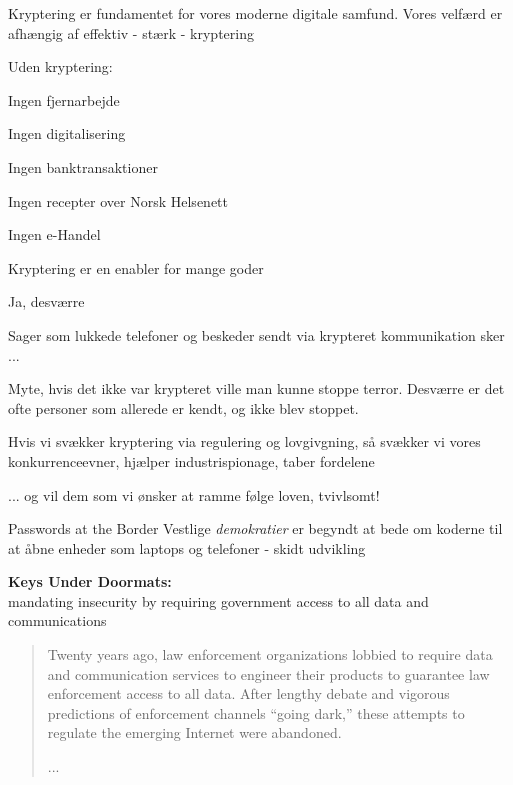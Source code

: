 \documentclass[20pt,landscape,a4paper,footrule]{foils}
\begin{document}

Kryptering er fundamentet for vores moderne digitale samfund. Vores velfærd er afhængig af effektiv - stærk - kryptering

Uden kryptering:
\begin{list2}
\item Ingen fjernarbejde
\item Ingen digitalisering
\item Ingen banktransaktioner
\item Ingen recepter over Norsk Helsenett
\item Ingen e-Handel
\end{list2}

\centerline{Kryptering er en enabler for mange goder}


Ja, desværre

Sager som lukkede telefoner og beskeder sendt via krypteret kommunikation sker ...

Myte, hvis det ikke var krypteret ville man kunne stoppe terror. Desværre er det ofte personer som allerede er kendt, og ikke blev stoppet.

Hvis vi svækker kryptering via regulering og lovgivgning, så svækker vi vores konkurrenceevner, hjælper industrispionage, taber fordelene

... og vil dem som vi ønsker at ramme følge loven, tvivlsomt!


Passwords at the Border
Vestlige \emph{demokratier} er begyndt at bede om koderne til at åbne enheder som laptops og telefoner - skidt udvikling

{\bf Keys Under Doormats:}\\
mandating insecurity by requiring government access to all
data and communications

\begin{quote}
Twenty years ago, law enforcement organizations lobbied to require data and
communication services to engineer their products to guarantee law enforcement
access to all data. After lengthy debate and vigorous predictions of enforcement
channels “going dark,” these attempts to regulate the emerging Internet were abandoned.

...
\end{quote}

\end{document}
